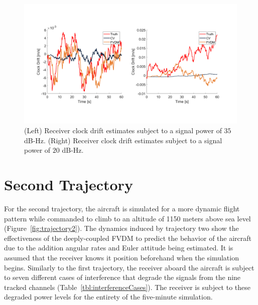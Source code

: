 \begin{figure}[!ht]
    \centering
    \includegraphics[width=\linewidth]{Figures/resultsv2/Slide8.PNG}
    \caption{(Left) Receiver clock drift estimates subject to a signal power of \(35\) dB-Hz. (Right) Receiver clock drift estimates subject to a signal power of \(20\) dB-Hz.}\label{fig:fixthis1}
\end{figure}









\clearpage

\section{\textbf{Second Trajectory}}
For the second trajectory, the aircraft is simulated for a more dynamic flight pattern while commanded to climb to an altitude of 1150 meters above sea level (Figure~\ref{fig:trajectory2}). The dynamics induced by trajectory two show the effectiveness of the deeply-coupled FVDM to predict the behavior of the aircraft due to the addition angular rates and Euler attitude being estimated. It is assumed that the receiver knows it position beforehand when the simulation begins. Similarly to the first trajectory, the receiver aboard the aircraft is subject to seven different cases of interference that degrade the signals from the nine tracked channels (Table~\ref{tbl:interferenceCases}). The receiver is subject to these degraded power levels for the entirety of the five-minute simulation.

